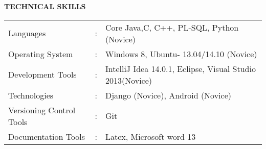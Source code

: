 \documentclass{article}
\begin{document}
\vspace{1cm}
\begin{minipage}{\textwidth}
\begin{framed}
	\large{\textbf{TECHNICAL SKILLS}}
\end{framed}
\setlength{\tabcolsep}{0.7em}
\def\arraystretch{1.7}
\begin{tabular}{lcp{}}
	Languages & : & Core Java,C, C++, PL-SQL, Python (Novice)\\
	Operating System &  : &  Windows 8, Ubuntu- 13.04/14.10 (Novice)\\
	Development Tools &  : & IntelliJ Idea 14.0.1, Eclipse, Visual Studio 2013(Novice)\\
	Technologies &  : &  Django (Novice), Android (Novice)\\
	Versioning Control Tools & : & Git\\
	Documentation Tools & : & Latex, Microsoft word 13\\

\end{tabular}
\end{minipage}

\vspace{1cm}
\end{document}
